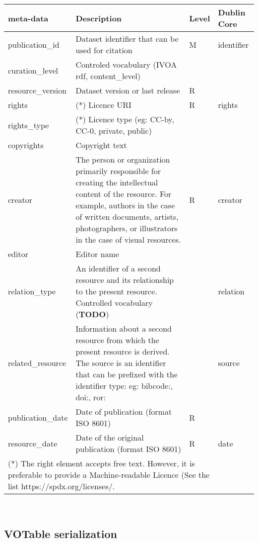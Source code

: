 \documentclass[11pt,a4paper]{ivoa}
\begin{document}
\begin{tabular}{|l|p{5cm}|l|l|}  \hline
\textbf{meta-data} & \textbf{Description} & \textbf{Level} & \textbf{Dublin Core}\\ \hline
publication\_id    & Dataset identifier that can be used for citation& M  & identifier\\ \hline
curation\_level    & Controled vocabulary
                   (IVOA rdf, content\_level) &  &  \\ \hline
resource\_version  & Dataset version or last release & R & \\ \hline 
rights             & (*) Licence URI & R & rights\\ \hline
rights\_type       & (*) Licence type (eg: CC-by, CC-0, private, public) &  &  \\ \hline
copyrights         & Copyright text &  & \\ \hline
creator            & The person or organization primarily responsible for creating the
                     intellectual content of the resource.  For example, authors in the
                     case of written documents, artists, photographers, or illustrators in
                     the case of visual resources. & R & creator\\ \hline
editor             & Editor name &  & \\ \hline
relation\_type     & An identifier of a second resource and its relationship to the
                     present resource. 
                     Controlled vocabulary (\textbf{TODO}) & & relation\\ \hline
related\_resource  & Information about a second resource from which the present resource
                     is derived. The source is an identifier that can be prefixed with the identifier type: eg: bibcode:, doi:, ror: &  & source\\ \hline
publication\_date  & Date of publication (format ISO 8601) &  R &  \\ \hline
resource\_date     & Date of the original publication (format ISO 8601) & R & date\\ \hline
\multicolumn{3}{p{8cm}}{(*) The right element	accepts free text. However,	it is preferable to provide	a Machine-readable Licence (See the list https://spdx.org/licenses/.}
\end{tabular}\\



\subsection{VOTable serialization}
\end{document}
